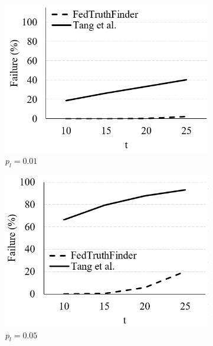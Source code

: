 \begin{figure}[t]%
		\centering
		\begin{subfigure}[t]{.32\linewidth}
			\includegraphics[width=1\linewidth]{./fig/fail_trust_0.01.PNG}
			\caption{$p_l=0.01$}
			\label{fig:trust_0.01}
		\end{subfigure}
		\begin{subfigure}[t]{.32\linewidth}
			\includegraphics[width=1\linewidth]{./fig/fail_trust_0.05.PNG}
			\caption{$p_l=0.05$}
			\label{fig:trust_0.05}
		\end{subfigure}
		\begin{subfigure}[t]{.32\linewidth}

\end{subfigure}
\end{figure}
